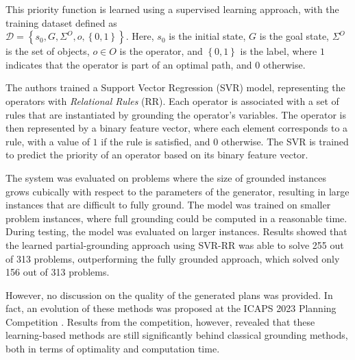 This priority function is learned using a supervised learning approach, with the training dataset defined as \\ $\mathcal{D} = \left\{s_{0}, G, \Sigma^{O}, o, \left\{0,1\right\} \right\}$. Here, $s_{0}$ is the initial state, $G$ is the goal state, $\Sigma^{O}$ is the set of objects, $o \in O$ is the operator, and $\left\{0,1\right\}$ is the label, where $1$ indicates that the operator is part of an optimal path, and $0$ otherwise.

The authors trained a Support Vector Regression (SVR) model, representing the operators with \textit{Relational Rules} (RR). Each operator is associated with a set of rules that are instantiated by grounding the operator's variables. The operator is then represented by a binary feature vector, where each element corresponds to a rule, with a value of $1$ if the rule is satisfied, and $0$ otherwise. The SVR is trained to predict the priority of an operator based on its binary feature vector.

The system was evaluated on problems where the size of grounded instances grows cubically with respect to the parameters of the generator, resulting in large instances that are difficult to fully ground. The model was trained on smaller problem instances, where full grounding could be computed in a reasonable time. During testing, the model was evaluated on larger instances. Results showed that the learned partial-grounding approach using SVR-RR was able to solve 255 out of 313 problems, outperforming the fully grounded approach, which solved only 156 out of 313 problems.

However, no discussion on the quality of the generated plans was provided. In fact, an evolution of these methods was proposed at the ICAPS 2023 Planning Competition \cite{gzubicki2023huzar}. Results from the competition, however, revealed that these learning-based methods are still significantly behind classical grounding methods, both in terms of optimality and computation time.
